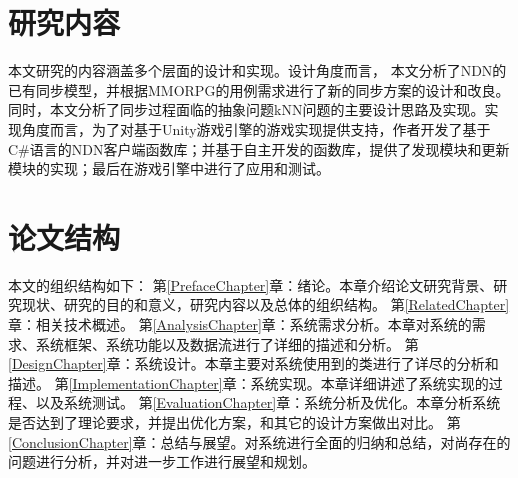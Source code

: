 \section{研究内容}
\par
本文研究的内容涵盖多个层面的设计和实现。设计角度而言， 本文分析了NDN的已有同步模型，并根据MMORPG的用例需求进行了新的同步方案的设计和改良。同时，本文分析了同步过程面临的抽象问题kNN问题的主要设计思路及实现。实现角度而言，为了对基于Unity游戏引擎的游戏实现提供支持，作者开发了基于C\#语言的NDN客户端函数库；并基于自主开发的函数库，提供了发现模块和更新模块的实现；最后在游戏引擎中进行了应用和测试。
\section{论文结构}
\par
本文的组织结构如下：
第\ref{PrefaceChapter}章：绪论。本章介绍论文研究背景、研究现状、研究的目的和意义，研究内容以及总体的组织结构。
第\ref{RelatedChapter}章：相关技术概述。 
第\ref{AnalysisChapter}章：系统需求分析。本章对系统的需求、系统框架、系统功能以及数据流进行了详细的描述和分析。
第\ref{DesignChapter}章：系统设计。本章主要对系统使用到的类进行了详尽的分析和描述。 
第\ref{ImplementationChapter}章：系统实现。本章详细讲述了系统实现的过程、以及系统测试。
第\ref{EvaluationChapter}章：系统分析及优化。本章分析系统是否达到了理论要求，并提出优化方案，和其它的设计方案做出对比。
第\ref{ConclusionChapter}章：总结与展望。对系统进行全面的归纳和总结，对尚存在的问题进行分析，并对进一步工作进行展望和规划。

